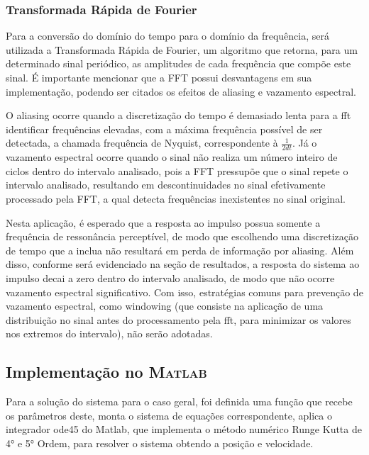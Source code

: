 \documentclass[12pt,a4paper]{article}
\newcommand{\MATLAB}{\textsc{Matlab}}
\begin{document}
\subsubsection{Transformada Rápida de Fourier}
\par Para a conversão do domínio do tempo para o domínio da frequência, será utilizada a Transformada Rápida de Fourier, um algoritmo que retorna, para um determinado sinal periódico, as amplitudes de cada frequência que compõe este sinal. É importante mencionar que a FFT possui desvantagens em sua implementação, podendo ser citados os efeitos de aliasing e vazamento espectral.
\par O aliasing ocorre quando a discretização do tempo é demasiado lenta para a fft identificar frequências elevadas, com a máxima frequência possível de ser detectada, a chamada frequência de Nyquist, correspondente à $\frac{1}{2dt}$. Já o vazamento espectral ocorre quando o sinal não realiza um número inteiro de ciclos dentro do intervalo analisado, pois a FFT pressupõe que o sinal repete o intervalo analisado, resultando em descontinuidades no sinal efetivamente processado pela FFT, a qual detecta frequências inexistentes no sinal original.
\par Nesta aplicação, é esperado que a resposta ao impulso possua somente a frequência de ressonância perceptível, de modo que escolhendo uma discretização de tempo que a inclua não resultará em perda de informação por aliasing. Além disso, conforme será evidenciado na seção de resultados, a resposta do sistema ao impulso decai a zero dentro do intervalo analisado, de modo que não ocorre vazamento espectral significativo. Com isso, estratégias comuns para prevenção de vazamento espectral, como windowing (que consiste na aplicação de uma distribuição no sinal antes do processamento pela fft, para minimizar os valores nos extremos do intervalo), não serão adotadas.

\vspace{0.5\baselineskip}

\subsection{Implementação no \MATLAB}
\vspace{2\baselineskip}

\par Para a solução do sistema para o caso geral, foi definida uma função que recebe os parâmetros deste, monta o sistema de equações correspondente, aplica o integrador ode45 do Matlab, que implementa o método numérico Runge Kutta de 4° e 5° Ordem, para resolver o sistema obtendo a posição e velocidade.
\end{document}

